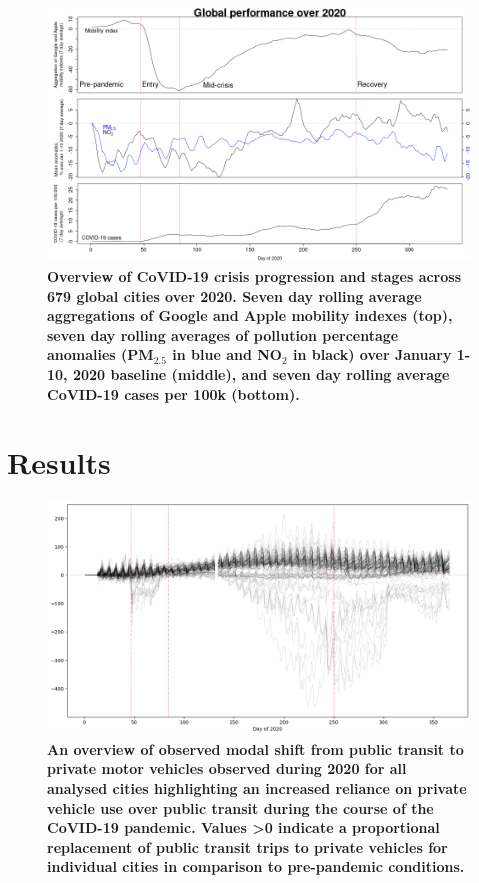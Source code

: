 \documentclass[preprint,12pt]{elsarticle}
\begin{document}
\begin{figure}
\centering
\includegraphics[trim={0 0 15 20},clip,scale=0.45]{Images/LancetPHOverall.png}
\caption{\bf Overview of CoVID-19 crisis progression and stages across 679 global cities over 2020. Seven day rolling average aggregations of Google and Apple mobility indexes (top), seven day rolling averages of pollution percentage anomalies (PM$_{2.5}$ in blue and NO$_{2}$ in black) over January 1-10, 2020 baseline (middle), and seven day rolling average CoVID-19 cases per 100k (bottom).}
 \label{fig:stages}
\end{figure}

\section*{Results}

\begin{figure}
\centering
\includegraphics[trim={0 0 0 0},clip,scale=0.4]{Images/DrivingvsTransit.png}
\caption{\bf An overview of observed modal shift from public transit to private motor vehicles observed during 2020 for all analysed cities highlighting an increased reliance on private vehicle use over public transit during the course of the CoVID-19 pandemic. Values \textgreater 0 indicate a proportional replacement of public transit trips to private vehicles for individual cities in comparison to pre-pandemic conditions.}  
 \label{fig:driv_trans}
\end{figure}
\end{document}
